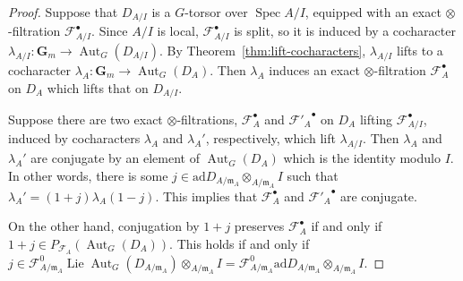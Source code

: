 \documentclass{amsart}
\renewcommand{\mathbb}{\mathbf}
\DeclareMathOperator{\Lie}{Lie}
\def\ad{\mathrm{ad}}
\theoremstyle{definition}
\theoremstyle{remark}
\newcommand{\mar}[1]{}
\newcommand{\mar}[1]{\marginpar{\raggedright\tiny squirrel #1}}
\newcommand{\Q}{\QQ}
\newcommand{\GG}{{\mathbb G}}
\newcommand{\QQ}{{\mathbb Q}}
\DeclareMathOperator{\Aut}{Aut}
\DeclareMathOperator{\Gal}{Gal}
\DeclareMathOperator{\GL}{GL}
\DeclareMathOperator{\Spec}{Spec}
\newcommand{\dR}{\mathrm{dR}}
\newcommand{\Gm}{\GG_m}
\begin{document}
\begin{proof}
Suppose that $D_{A/I}$ is a $G$-torsor over $\Spec A/I$, equipped with an exact $\otimes$-filtration $\mathcal{F}^\bullet_{A/I}$.  Since $A/I$ is local, $\mathcal{F}^\bullet_{A/I}$ is split, so it is induced by a cocharacter $\lambda_{A/I}:\Gm\rightarrow\Aut_G(D_{A/I})$.  By Theorem~\ref{thm:lift-cocharacters}, $\lambda_{A/I}$ lifts to a cocharacter $\lambda_A:\Gm\rightarrow \Aut_G(D_A)$.  Then $\lambda_A$ induces an exact $\otimes$-filtration $\mathcal{F}^\bullet_A$ on $D_A$ which lifts that on $D_{A/I}$.

Suppose there are two exact $\otimes$-filtrations, $\mathcal{F}^\bullet_A$ and ${\mathcal{F}'_A}^\bullet$ on $D_A$ lifting $\mathcal{F}^\bullet_{A/I}$, induced by cocharacters $\lambda_A$ and $\lambda_A'$, respectively, which lift $\lambda_{A/I}$.  Then $\lambda_A$ and $\lambda_A'$ are conjugate by an element of $\Aut_G(D_A)$ which is the identity modulo $I$.  In other words, there is some $j\in \ad D_{A/\mathfrak{m}_A}\otimes_{A/\mathfrak{m}_A}I$ such that $\lambda_A'=(1+j)\lambda_A(1-j)$.  This implies that $\mathcal{F}^\bullet_A$ and ${\mathcal{F}'_A}^\bullet$ are conjugate.

On the other hand, conjugation by $1+j$ preserves $\mathcal{F}^\bullet_A$ if
and only if $1+j\in P_{\mathcal{F}_A}(\Aut_G(D_A))$.  This holds if
and only if $j\in
\mathcal{F}_{A/\mathfrak{m}_A}^0\Lie\Aut_G(D_{A/\mathfrak{m}_A})\otimes_{A/\mathfrak{m}_A}I=\mathcal{F}_{A/\mathfrak{m}_A}^0\ad
D_{A/\mathfrak{m}_A}\otimes_{A/\mathfrak{m}_A}I$.%
\end{proof}


\end{document}
